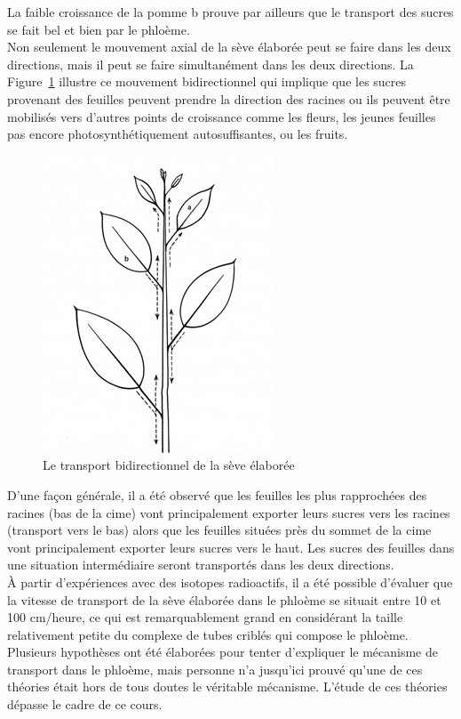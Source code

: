 La faible croissance de la pomme b prouve par ailleurs que le transport des sucres se fait bel et bien par le phloème.\\

Non seulement le mouvement axial de la sève élaborée peut se faire dans les deux directions, mais il peut se faire simultanément dans les deux directions. La Figure~\ref{phloeme} illustre ce mouvement bidirectionnel qui implique que les sucres provenant des feuilles peuvent prendre la direction des racines ou ils peuvent être mobilisés vers d'autres points de croissance comme les fleurs, les jeunes feuilles pas encore photosynthétiquement autosuffisantes, ou les fruits. 

\begin{figure}[ht]
\centering
\includegraphics[scale=0.5]{img/ch2_dir_phloeme2}
\caption{Le transport bidirectionnel de la sève élaborée \citep{zimmerman1971trees}}
\label{phloeme}
\end{figure}

D'une façon générale, il a été observé que les feuilles les plus rapprochées des racines (bas de la cime) vont principalement exporter leurs sucres vers les racines (transport vers le bas) alors que les feuilles situées près du sommet de la cime vont principalement exporter leurs sucres vers le haut. Les sucres des feuilles dans une situation intermédiaire seront transportés dans les deux directions.\\ 

À partir d'expériences avec des isotopes radioactifs, il a été possible d'évaluer que la vitesse de transport de la sève élaborée dans le phloème se situait entre 10 et 100 cm/heure, ce qui est remarquablement grand en considérant la taille relativement petite du complexe de tubes criblés qui compose le phloème. Plusieurs hypothèses ont été élaborées pour tenter d'expliquer le mécanisme de transport dans le phloème, mais personne n'a jusqu'ici prouvé qu'une de ces théories était hors de tous doutes le véritable mécanisme. L'étude de ces théories dépasse le cadre de ce cours.\\

